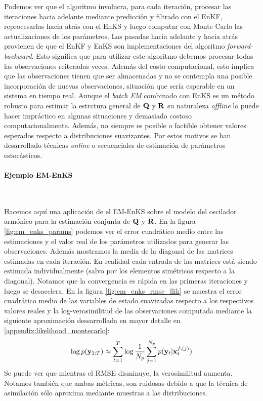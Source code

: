 Podemos ver que el algoritmo involucra, para cada iteración, procesar las iteraciones hacia adelante mediante predicción y filtrado con el EnKF, reprocesarlas hacia atrás con el EnKS y luego computar con Monte Carlo las actualizaciones de los parámetros. Las pasadas hacia adelante y hacia atrás provienen de que el EnKF y EnKS son implementaciones del algoritmo \textit{forward-backward}. Esto significa que para utilizar este algoritmo debemos procesar todas las observaciones reiteradas veces. Además del costo computacional, esto implica que las observaciones tienen que ser almacenadas y no se contempla una posible incorporación de nuevas observaciones, situación que sería esperable en un sistema en tiempo real. Aunque el \textit{batch EM} combinado con EnKS es un método robusto para estimar la estrctura general de $\mathbf{Q}$ y $\mathbf{R}$ su naturaleza \textit{offline} lo puede hacer impráctico en algunas situaciones y demasiado costoso computacionalmente. Además, no siempre es posible o factible obtener valores esperados respecto a distribuciones suavizantes. Por estos motivos se han desarrollado técnicas \textit{online} o secuenciales de estimación de parámetros estocásticos. 

\paragraph{Ejemplo EM-EnKS} \

Hacemos aquí una aplicación de el EM-EnKS sobre el modelo del oscilador armónico para la estimación conjunta de $\mathbf{Q}$ y $\mathbf{R}$. En la figura \ref{fig:em_enks_params} podemos ver el error cuadrático medio entre las estimaciones y el valor real de los parámetros utilizados para generar las observaciones. Además mostramos la media de la diagonal de las matrices estimadas en cada iteración. En realidad cada entrada de las matrices está siendo estimada individualmente (salvo por los elementos simétricos respecto a la diagonal). Notamos que la convergencia es rápida en las primeras iteraciones y luego se desacelera. En la figura \ref{fig:em_enks_rmse_llik} se muestra el error cuadrático medio de las variables de estado suavizadas respecto a los respectivos valores reales y la log-verosimilitud de las observaciones computada mediante la siguiente aproximación dessarrollada en mayor detalle en \ref{appendix:likelihood_montecarlo}:
\begin{align}
    \log p(\mathbf{y}_{1:T}) \approx \sum_{t=1}^{T} \log \frac{1}{N_p} \sum_{j=1}^{N_p} p(\mathbf{y}_t | \mathbf{x}_t^{f, (j)}) \label{eq:likelihood_montecarlo}
\end{align}
Se puede ver que mientras el RMSE disminuye, la verosimilitud aumenta. Notamos también que ambas métricas, son ruidosas debido a que la técnica de asimilación sólo aproxima mediante muestras a las distribuciones.

